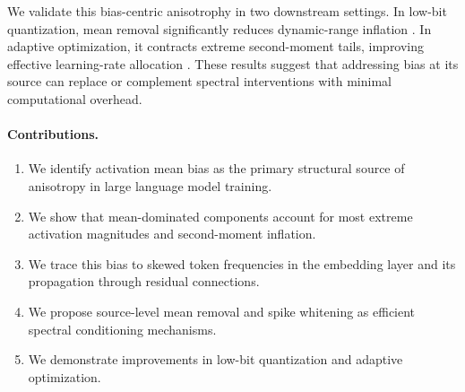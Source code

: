We validate this bias-centric anisotrophy in two downstream settings.
In low-bit quantization, mean removal significantly reduces dynamic-range inflation
\cite{xiao2023smoothquant,wei2023outlier,ashkboos2024quarot}.
In adaptive optimization, it contracts extreme second-moment tails,
improving effective learning-rate allocation
\cite{kingma2014adam,spectra2026}.
These results suggest that addressing bias at its source
can replace or complement spectral interventions
with minimal computational overhead.


\paragraph{Contributions.}
\begin{enumerate}[leftmargin=*,itemsep=2pt]
    \item We identify activation mean bias as the primary structural source of anisotropy in large language model training.
    \item We show that mean-dominated components account for most extreme activation magnitudes and second-moment inflation.
    \item We trace this bias to skewed token frequencies in the embedding layer and its propagation through residual connections.
    \item We propose source-level mean removal and spike whitening as efficient spectral conditioning mechanisms.
    \item We demonstrate improvements in low-bit quantization and adaptive optimization.
\end{enumerate}


















